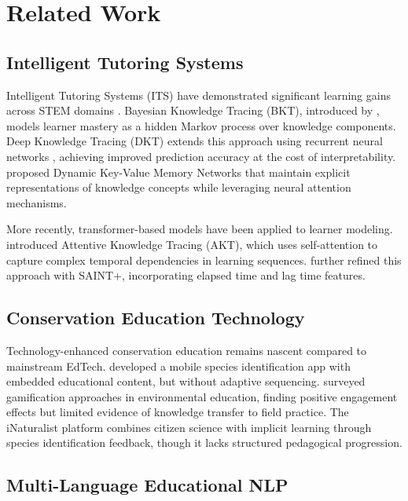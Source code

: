 \section{Related Work}

\label{sec:related}

\subsection{Intelligent Tutoring Systems}

Intelligent Tutoring Systems (ITS) have demonstrated significant learning gains across STEM domains \citep{vanlehn2011relative}.
Bayesian Knowledge Tracing (BKT), introduced by \citet{corbett1994knowledge}, models learner mastery as a hidden Markov process over knowledge components.
Deep Knowledge Tracing (DKT) extends this approach using recurrent neural networks \citep{piech2015deep}, achieving improved prediction accuracy at the cost of interpretability.
\citet{zhang2017dynamic} proposed Dynamic Key-Value Memory Networks that maintain explicit representations of knowledge concepts while leveraging neural attention mechanisms.

More recently, transformer-based models have been applied to learner modeling.
\citet{ghosh2020context} introduced Attentive Knowledge Tracing (AKT), which uses self-attention to capture complex temporal dependencies in learning sequences.
\citet{shin2021saint} further refined this approach with SAINT+, incorporating elapsed time and lag time features.

\subsection{Conservation Education Technology}

Technology-enhanced conservation education remains nascent compared to mainstream EdTech.
\citet{johnson2018wildlife} developed a mobile species identification app with embedded educational content, but without adaptive sequencing.
\citet{rousell2019gamification} surveyed gamification approaches in environmental education, finding positive engagement effects but limited evidence of knowledge transfer to field practice.
The iNaturalist platform \citep{horn2018inaturalist} combines citizen science with implicit learning through species identification feedback, though it lacks structured pedagogical progression.

\subsection{Multi-Language Educational NLP}

